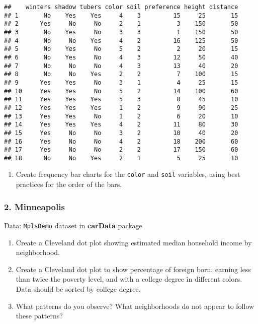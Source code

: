 \documentclass[]{article}
\providecommand{\tightlist}{%
  \setlength{\itemsep}{0pt}\setlength{\parskip}{0pt}}
\begin{document}
\begin{verbatim}
##    winters shadow tubers color soil preference height distance
## 1       No    Yes    Yes     4    3         15     25       15
## 2      Yes     No     No     2    1          3    150       50
## 3       No    Yes     No     3    3          1    150       50
## 4       No     No    Yes     4    2         16    125       50
## 5       No    Yes     No     5    2          2     20       15
## 6       No    Yes     No     4    3         12     50       40
## 7       No     No     No     4    3         13     40       20
## 8       No     No    Yes     2    2          7    100       15
## 9      Yes    Yes     No     3    1          4     25       15
## 10     Yes    Yes     No     5    2         14    100       60
## 11     Yes    Yes    Yes     5    3          8     45       10
## 12     Yes    Yes    Yes     1    2          9     90       25
## 13     Yes    Yes     No     1    2          6     20       10
## 14     Yes    Yes    Yes     4    2         11     80       30
## 15     Yes     No     No     3    2         10     40       20
## 16     Yes     No     No     4    2         18    200       60
## 17     Yes     No     No     2    2         17    150       60
## 18      No     No    Yes     2    1          5     25       10
\end{verbatim}

\begin{enumerate}
\def\labelenumi{(\alph{enumi})}
\setcounter{enumi}{1}
\tightlist
\item
  Create frequency bar charts for the \texttt{color} and \texttt{soil}
  variables, using best practices for the order of the bars.
\end{enumerate}

\subsubsection{2. Minneapolis}\label{minneapolis}

Data: \texttt{MplsDemo} dataset in \textbf{carData} package

\begin{enumerate}
\def\labelenumi{(\alph{enumi})}
\item
  Create a Cleveland dot plot showing estimated median household income
  by neighborhood.
\item
  Create a Cleveland dot plot to show percentage of foreign born,
  earning less than twice the poverty level, and with a college degree
  in different colors. Data should be sorted by college degree.
\item
  What patterns do you observe? What neighborhoods do not appear to
  follow these patterns?
\end{enumerate}
\end{document}
